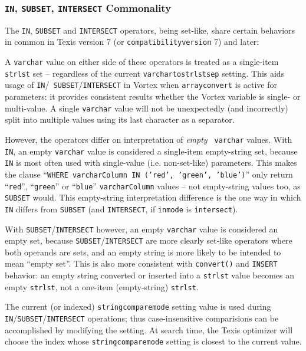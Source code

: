 \subsubsection{{\tt IN}, {\tt SUBSET}, {\tt INTERSECT} Commonality}
\label{InSubsetIntersectCommonality}

The {\tt IN}, {\tt SUBSET} and {\tt INTERSECT} operators, being
set-like, share certain behaviors in common in Texis version 7 (or
\verb`compatibilityversion` 7) and later:

  A \verb`varchar` value on either side of these operators is treated
as a single-item \verb`strlst` set -- regardless of the current
\verb`varchartostrlstsep` setting.  This aids usage of {\tt IN}/{\tt
SUBSET}/{\tt INTERSECT} in Vortex when \verb`arrayconvert` is active
for parameters: it provides consistent results whether the Vortex
variable is single- or multi-value.  A single \verb`varchar` value
will not be unexpectedly (and incorrectly) split into multiple values
using its last character as a separator.

  However, the operators differ on interpretation of {\em empty} {\tt
varchar} values.  With {\tt IN}, an empty {\tt varchar} value is
considered a single-item empty-string set, because {\tt IN} is most
often used with single-value (i.e. non-set-like) parameters.  This
makes the clause ``{\tt WHERE varcharColumn IN ('red', 'green',
'blue')}'' only return ``\verb`red`'', ``\verb`green`'' or
``\verb`blue`'' {\tt varcharColumn} values -- not empty-string values
too, as {\tt SUBSET} would.  This empty-string interpretation
difference is the one way in which {\tt IN} differs from {\tt SUBSET}
(and {\tt INTERSECT}, if \verb`inmode` is \verb`intersect`).

  With {\tt SUBSET}/{\tt INTERSECT} however, an empty {\tt varchar}
value is considered an empty set, because {\tt SUBSET}/{\tt INTERSECT}
are more clearly set-like operators where both operands are sets, and
an empty string is more likely to be intended to mean ``empty set''.
This is also more consistent with {\tt convert()} and {\tt INSERT}
behavior: an empty string converted or inserted into a {\tt strlst}
value becomes an empty {\tt strlst}, not a one-item (empty-string)
{\tt strlst}.

  The current (or indexed) \verb`stringcomparemode` setting value is
used during {\tt IN}/{\tt SUBSET}/{\tt INTERSECT} operations; thus
case-insensitive comparisions can be accomplished by modifying the
setting.  At search time, the Texis optimizer will choose the index
whose \verb`stringcomparemode` setting is closest to the current value.

